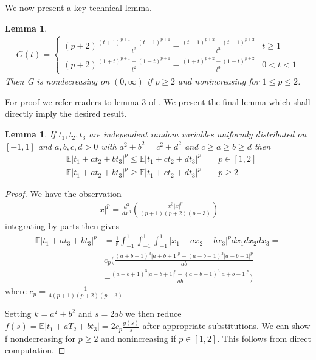 \documentclass[10pt]{article}
\newcommand{\E}{\mathbb{E}}
\newcommand{\1}{\textbf{1}}
\newtheorem{lemma}[theorem]{Lemma}
\theoremstyle{remark}
\theoremstyle{definition}
\begin{document}
We now present a key technical lemma.

\begin{lemma}
	\begin{align*}
		G(t)=
		\begin{cases}
			(p+2)\frac{(t+1)^{p+1}-(t-1)^{p+1}}{t^2} - \frac{(t+1)^{p+2}-(t-1)^{p+2}}{t^3} & t \geq 1\\
			(p+2)\frac{(1+t)^{p+1}+(1-t)^{p+1}}{t^2} - \frac{(1+t)^{p+2}-(1-t)^{p+2}}{t^3} & 0 < t < 1
		\end{cases}
	\end{align*}
	Then G is nondecreasing on $(0,\infty)$ if $p \geq 2$ and nonincreasing for $1 \leq p \leq 2$. 
\end{lemma}

For proof we refer readers to lemma 3 of \cite{LO}. We present the final lemma which shall directly imply the desired result.

\begin{lemma}
	If $t_1,t_2,t_3$ are independent random variables uniformly distributed on $[-1,1]$ and $a,b,c,d > 0$ with $a^2 + b^2 = c^2 + d^2$ and $c \geq a \geq b \geq d$ then
	\begin{align*}
		&\E |t_1 + at_2 + bt_3|^p \leq \E |t_1 + ct_2 + dt_3|^p \qquad p \in [1,2] \\
		&\E|t_1 + at_2 + bt_3|^p \geq \E|t_1 + ct_2 + dt_3|^p \qquad p \geq 2
	\end{align*}
\end{lemma}

\begin{proof}
	We have the observation 
	\begin{align*}
		|x|^p = \frac{d^3}{dx^3}(\frac{x^3|x|^p}{(p+1)(p+2)(p+3)})
	\end{align*}
	integrating by parts then gives
	\begin{align*}
		\E|t_1 + at_3 + bt_3|^p &= \frac{1}{8}\int_{-1}^1\int_{-1}^1\int_{-1}^1|x_1 + ax_2 +bx_3|^p dx_1dx_2dx_3 =\\ &c_p(\frac{(a+b+1)^3|a+b+1|^p+(a-b-1)^3|a-b-1|^p}{ab} \\&- \frac{(a-b+1)^3|a-b+1|^p+(a+b-1)^3|a+b-1|^p}{ab})
	\end{align*}
	where $c_p = \frac{1}{4(p+1)(p+2)(p+3)}$

	Setting $k = a^2+b^2$ and $s = 2ab$ we then reduce $f(s) = \E|t_1+aT_2+bt_3| = 2c_p \frac{g(s)}{s}$ after appropriate substitutions. We can show f nondecreasing for $p \geq 2$ and nonincreasing if $p \in [1,2]$. This follows from direct computation.
\end{proof}
\end{document}
